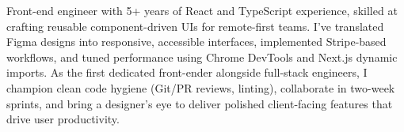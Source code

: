 \begin{cvparagraph}
Front-end engineer with 5+ years of React and TypeScript experience, skilled at crafting reusable component-driven UIs for remote-first teams. I’ve translated Figma designs into responsive, accessible interfaces, implemented Stripe-based workflows, and tuned performance using Chrome DevTools and Next.js dynamic imports. As the first dedicated front-ender alongside full-stack engineers, I champion clean code hygiene (Git/PR reviews, linting), collaborate in two-week sprints, and bring a designer’s eye to deliver polished client-facing features that drive user productivity.
\end{cvparagraph}
